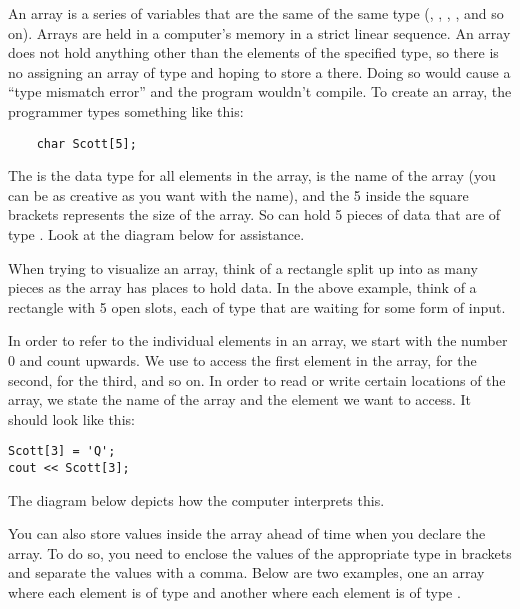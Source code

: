 An array is a series of variables that are the same of the same type (, , , , and so on).
Arrays are held in a computer's memory in a strict linear sequence.
An array does not hold anything other than the elements of the specified type, so there is no assigning an array of type  and hoping to store a  there. 
Doing so would cause a ``type mismatch error'' and the program wouldn't compile. 
To create an array, the programmer types something like this:

\begin{lstlisting}
	char Scott[5];
\end{lstlisting}

The  is the data type for all elements in the array,  is the name of the array (you can be as creative as you want with the name), and the 5 inside the square brackets represents the size of the array. 
So  can hold 5 pieces of data that are of type . 
Look at the diagram below for assistance.


When trying to visualize an array, think of a rectangle split up into as many pieces as the array has places to hold data.
In the above example, think of a rectangle with 5 open slots, each of type  that are waiting for some form of input. 

In order to refer to the individual elements in an array, we start with the number 0 and count upwards. 
We use \Code{[0]} to access the first element in the array, \Code{[1]} for the second, \Code{[2]} for the third, and so on. 
In order to read or write certain locations of the array, we state the name of the array and the element we want to access. 
It should look like this:

\begin{lstlisting}
Scott[3] = 'Q';
cout << Scott[3];
\end{lstlisting}

The diagram below depicts how the computer interprets this.


You can also store values inside the array ahead of time when you declare the array. 
To do so, you need to enclose the values of the appropriate type in brackets and separate the values with a comma. 
Below are two examples, one an array where each element is of type  and another where each element is of type .

